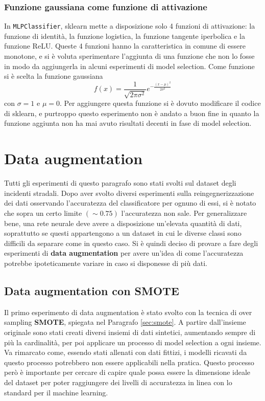 \documentclass[12pt, twoside, letterpaper]{report}
\begin{document}
			\subsubsection{Funzione gaussiana come funzione di attivazione}
				In \texttt{MLPClassifier}, sklearn mette a disposizione solo 4 funzioni di attivazione: la funzione di identità, la funzione logistica, la funzione tangente iperbolica e la funzione ReLU. Queste 4 funzioni hanno la caratteristica in comune di essere monotone, e si è voluta sperimentare l'aggiunta di una funzione che non lo fosse in modo da aggiungerla in alcuni esperimenti di model selection. Come funzione si è scelta la funzione gaussiana $$f(x) = \frac{1}{\sqrt{2 \pi \sigma ^ 2}} e^{- \frac{(x - \mu)^2}{2 \sigma^2}}$$  con $\sigma = 1$ e $\mu = 0$. Per aggiungere questa funzione si è dovuto modificare il codice di sklearn, e purtroppo questo esperimento non è andato a buon fine in quanto la funzione aggiunta non ha mai avuto risultati decenti in fase di model selection.
	
	\section{Data augmentation}
		Tutti gli esperimenti di questo paragrafo sono stati svolti sul dataset degli incidenti stradali. Dopo aver svolto diversi esperimenti sulla reingegnerizzazione dei dati osservando l'accuratezza del classificatore per ognuno di essi, si è notato che sopra un certo limite $(\sim 0.75)$ l'accuratezza non sale. Per generalizzare bene, una rete neurale deve avere a disposizione un'elevata quantità di dati, soprattutto se questi appartengono a un dataset in cui le diverse classi sono difficili da separare come in questo caso.  Si è quindi deciso di provare a fare degli esperimenti di \textbf{data augmentation} per avere un'idea di come l'accuratezza potrebbe ipoteticamente variare in caso si disponesse di più dati.
		
		\subsection{Data augmentation con SMOTE} \label{sec:data_aug_smote}
			Il primo esperimento di data augmentation è stato svolto con la tecnica di over sampling \textbf{SMOTE}, spiegata nel Paragrafo \ref{sec:smote}. A partire dall'insieme originale sono stati creati diversi insiemi di dati sintetici, aumentando sempre di più la cardinalità, per poi applicare un processo di model selection a ogni insieme. Va rimarcato come, essendo stati allenati con dati fittizi, i modelli ricavati da questo processo potrebbero non essere applicabili nella pratica. Questo processo però è importante per cercare di capire quale possa essere la dimensione ideale del dataset per poter raggiungere dei livelli di accuratezza in linea con lo standard per il machine learning.
			
\end{document}
